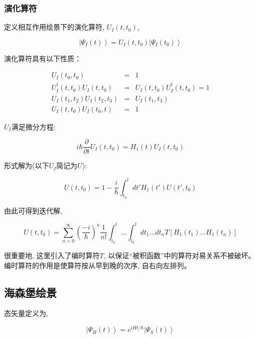 \subsubsection{演化算符}

定义相互作用绘景下的演化算符, $U_I(t, t_0)$,

\begin{equation*}
\left| \Psi_I (t) \right\rangle = U_I (t, t_0)\left|\Psi_I (t_0)
\right\rangle
\end{equation*}

演化算符具有以下性质：

\begin{eqnarray*}
  U_I (t_0, t_0) &=& 1 \\
  U_I^\dagger (t, t_0) U_I (t, t_0) &=& U_I (t, t_0) U_I^\dagger (t, t_0)
  = 1  \\
  U_I (t_1, t_2) U_I (t_2, t_3) &=& U_I (t_1, t_3) \\
  U_I (t, t_0) U_I (t_0, t) &=& 1
\end{eqnarray*}

$U_I$满足微分方程:

\begin{equation*}
i \hbar \frac{\partial }{\partial t} U_I (t, t_0) = H_1(t) U_I(t,
t_0)
\end{equation*}

形式解为(以下$U_I$简记为$U$):

\begin{equation*}
U(t, t_0) = 1- \frac{i}{\hbar}\int_{t_0}^t dt' H_1(t') U(t', t_0)
\end{equation*}

由此可得到迭代解,

\begin{equation*}
U(t, t_0) = \sum_{n=0}^{\infty} \left( \frac{-i}{\hbar} \right)^n
\frac{1}{n!}\int_{t_0}^t ... \int_{t_0}^t dt_1 ... dt_n T \left[
H_1(t_1)...H_1(t_n) \right]
\end{equation*}

很重要地, 这里引入了编时算符$T$,
以保证“被积函数”中的算符对易关系不被破坏。编时算符的作用是使算符按从早到晚的次序, 自右向左排列。

\subsection{海森堡绘景}

态矢量定义为,

\begin{equation*}
\left| \Psi_H (t) \right\rangle = e^{iHt / \hbar} \left| \Psi_S(t)
\right\rangle
\end{equation*}

